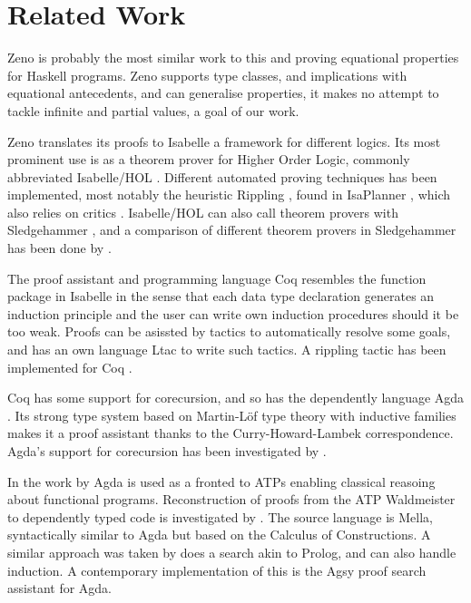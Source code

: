 \section{Related Work}

Zeno \citep{zeno} is probably the most similar work to this and
proving equational properties for Haskell programs. Zeno supports type
classes, and implications with equational antecedents, and can
generalise properties, it makes no attempt to tackle infinite and
partial values, a goal of our work.


Zeno translates its proofs to Isabelle a framework for different
logics. Its most prominent use is as a theorem prover for Higher Order
Logic, commonly abbreviated Isabelle/HOL \citep{isabelbook}. Different
automated proving techniques has been implemented, most notably the
heuristic Rippling \citep{dixonphd}, found in IsaPlanner
\citep{isaplanner}, which also relies on critics
\citep{productiveuse}. Isabelle/HOL can also call theorem provers with
Sledgehammer \citep{hammering}, and a comparison of different theorem
provers in Sledgehammer has been done by \cite{judgement}.

The proof assistant and programming language Coq resembles the
function package in Isabelle in the sense that each data type
declaration generates an induction principle and the user can write
own induction procedures should it be too weak. Proofs can be asissted
by tactics to automatically resolve some goals, and has an own
language Ltac to write such tactics. A rippling tactic has been
implemented for Coq \citep{inductioncoq}.

Coq has some support for corecursion, and so has the dependently
language Agda \citep{norell:thesis}. Its strong type system based on
Martin-Löf type theory \citep{mltt} with inductive families makes it a
proof assistant thanks to the Curry-Howard-Lambek correspondence. Agda's
support for corecursion has been investigated by \cite{productivity}.

In the work by \cite{agdaatp} Agda is used as a fronted to ATPs
enabling classical reasoing about functional programs.  Reconstruction
of proofs from the ATP Waldmeister to dependently typed code is
investigated by \cite{dtatp}. The source language is Mella,
syntactically similar to Agda but based on the Calculus of
Constructions. A similar approach was taken by \cite{agsy} does a
search akin to Prolog, and can also handle induction. A contemporary
implementation of this is the Agsy proof search assistant for Agda.

